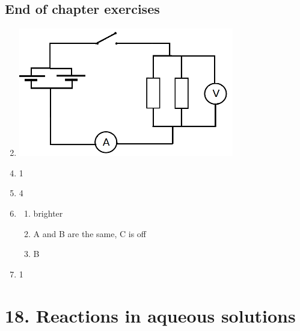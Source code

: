 \subsection{End of chapter exercises}
\begin{enumerate}[noitemsep, label=\textbf{(\arabic*)} ]
\setcounter{enumi}{1}
 \item \includegraphics[width=.3\textwidth]{photos/electric_circuits_circuitdiagrm.png}
\end{enumerate}
\begin{multicols}{3}
 \begin{enumerate}[noitemsep, label=\textbf{(\arabic*)} ]
\setcounter{enumi}{3}
\item 1
\item 4
\item 
 \begin{enumerate}[noitemsep, label=\textbf{(\alph*)} ]
\item brighter
\item A and B are the same, C is off
\item B
\end{enumerate}
\item 1
 \end{enumerate}
\end{multicols}

\section{18. Reactions in aqueous solutions}
